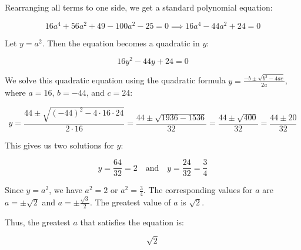 \begin{figure*}[htbp]
    \centering
\begin{tcolorbox}[title=Large Teacher CoT Example (2/2), promptstyle]
\lstset{
    basicstyle=\normalfont\sffamily\footnotesize,
    breaklines=true,
    frame=none,
    columns=fullflexible,
}
Rearranging all terms to one side, we get a standard polynomial equation:

\[
16a^4 + 56a^2 + 49 - 100a^2 - 25 = 0 \implies 16a^4 - 44a^2 + 24 = 0
\]

Let \(y = a^2\). Then the equation becomes a quadratic in \(y\):

\[
16y^2 - 44y + 24 = 0
\]

We solve this quadratic equation using the quadratic formula \(y = \frac{-b \pm \sqrt{b^2 - 4ac}}{2a}\), where \(a = 16\), \(b = -44\), and \(c = 24\):

\[
y = \frac{44 \pm \sqrt{(-44)^2 - 4 \cdot 16 \cdot 24}}{2 \cdot 16} = \frac{44 \pm \sqrt{1936 - 1536}}{32} = \frac{44 \pm \sqrt{400}}{32} = \frac{44 \pm 20}{32}
\]

This gives us two solutions for \(y\):

\[
y = \frac{64}{32} = 2 \quad \text{and} \quad y = \frac{24}{32} = \frac{3}{4}
\]

Since \(y = a^2\), we have \(a^2 = 2\) or \(a^2 = \frac{3}{4}\). The corresponding values for \(a\) are \(a = \pm \sqrt{2}\) and \(a = \pm \frac{\sqrt{3}}{2}\). The greatest value of \(a\) is \(\sqrt{2}\).

Thus, the greatest \(a\) that satisfies the equation is:

\[
\boxed{\sqrt{2}}
\]
\end{tcolorbox}
\end{figure*}



